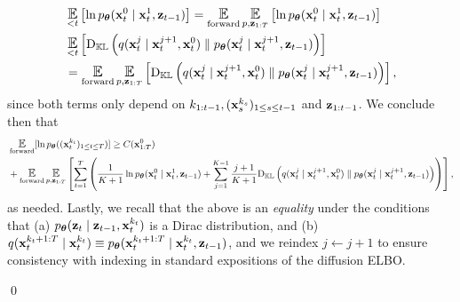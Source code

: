 \begin{align*}
&\Exp_{<t}\left[\ln \ptheta(\bx_t^{0} \mid \bx_{t}^{1},  \bz_{t-1})\right] = \Eforward \Epz\left[\ln \ptheta(\bx_t^{0} \mid \bx_{t}^{1},  \bz_{t-1})\right]\\
&\Exp_{<t}\left[\Dkl\left(q(\bx_{t}^{j} \mid \bx_t^{j+1},\bx_t^0) \parallel \ptheta(\bx_{t}^{j} \mid \bx_{t}^{j+1}, \bz_{t-1})\right)\right] \\
&= \Eforward \Epz\left[\Dkl\left(q(\bx_{t}^{j} \mid \bx_t^{j+1},\bx_t^0) \parallel \ptheta(\bx_{t}^{j} \mid \bx_{t}^{j+1}, \bz_{t-1})\right)\right],
\end{align*}
since both terms only depend on $k_{1:t-1},(\mathbf{x}_s^{k_s})_{1 \le s \le t-1}$ and $\mathbf{z}_{1:t-1}$. We conclude then that 
\begin{align*}
&\Eforward[\ln  \ptheta((\bx_{t}^{k_t})_{1 \le t \le T})] \ge C(\bx_{1:T}^0) \\
&+ \Eforward\Epz \left[\sum_{t=1}^T \left(\frac{1}{K+1}\ln \ptheta(\bx_t^{0} \mid \bx_{t}^{1},  \bz_{t-1}) +  \sum_{j=1}^{K-1}\frac{j+1}{K+1}\Dkl\left(q(\bx_{t}^{j} \mid \bx_t^{j+1},\bx_t^0) \parallel \ptheta(\bx_{t}^{j} \mid \bx_{t}^{j+1}, \bz_{t-1})\right)\right)\right], 
\end{align*}
as needed. Lastly, we recall that the above is an \emph{equality} under the conditions that \newline (a) $p_{\bm{\theta}}(\mathbf{z}_t \mid \mathbf{z}_{t-1},\mathbf{x}_t^{k_t})$ is a Dirac distribution, and (b) $q(\mathbf{x}_{t}^{k_t+1:T} \mid \mathbf{x}_t^{k_t}) \equiv p_{\bm{\theta}}(\mathbf{x}_{t}^{k_t+1:T} \mid \mathbf{x}_t^{k_t},\mathbf{z}_{t-1})$, and we reindex $j \gets j+1$ to ensure consistency with indexing in standard expositions of the diffusion ELBO. 

\qed






 















